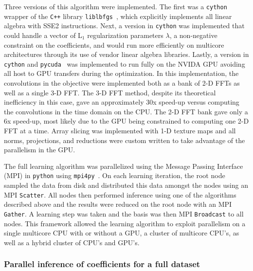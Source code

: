 Three versions of this algorithm were implemented. The first was a
\texttt{cython}\cite{behnel2011cython,seljebotn2009fast} wrapper of
the \verb!C++! library \texttt{liblbfgs}~\cite{liblbfgs}, which
explicitly implements all linear algebra with SSE2 instructions. Next,
a version in \texttt{cython} was implemented that could handle a
vector of L$_1$ regularization parameters $\lambda$, a non-negative
constraint on the coefficients, and would run more efficiently on
multicore architectures through its use of vendor linear algebra
libraries. Lastly, a version in \texttt{cython} and
\texttt{pycuda}~\cite{pycuda} was implemented to run fully on the
NVIDA GPU avoiding all host to GPU transfers during the
optimization. In this implementation, the convolutions in the
objective were implemented both as a bank of 2-D FFTs as well as a
single 3-D FFT. The 3-D FFT method, despite its theoretical
inefficiency in this case, gave an approximately 30x speed-up versus
computing the convolutions in the time domain on the CPU. The 2-D FFT
bank gave only a 6x speed-up, most likely due to the GPU being
constrained to computing one 2-D FFT at a time. Array slicing was
implemented with 1-D texture maps and all norms, projections, and
reductions were custom written to take advantage of the parallelism in
the GPU.

The full learning algorithm was parallelized using the Message Passing
Interface (MPI) in \texttt{python} using
\texttt{mpi4py}~\cite{seljebotn2009fast}. On each learning iteration,
the root node sampled the data from disk and distributed this data
amongst the nodes using an MPI \texttt{Scatter}. All nodes then
performed inference using one of the algorithms described above and
the results were reduced on the root node with an MPI
\texttt{Gather}. A learning step was taken and the basis was then MPI
\texttt{Broadcast} to all nodes. This framework allowed the learning
algorithm to exploit parallelism on a single multicore CPU with or
without a GPU, a cluster of multicore CPU's, as well as a hybrid
cluster of CPU's and GPU's.

\subsubsection{Parallel inference of coefficients for a full dataset}
\label{sec:parallelblock}

